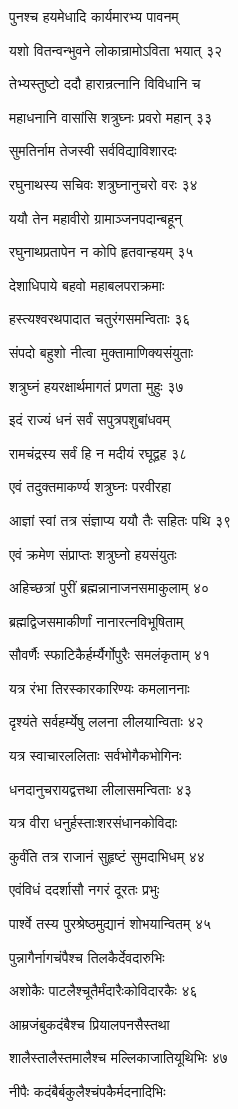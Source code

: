 पुनश्च हयमेधादि कार्यमारभ्य पावनम्

यशो वितन्वन्भुवने लोकान्रामोऽविता भयात् ३२

तेभ्यस्तुष्टो ददौ हारान्रत्नानि विविधानि च

महाधनानि वासांसि शत्रुघ्नः प्रवरो महान् ३३

सुमतिर्नाम तेजस्वी सर्वविद्याविशारदः

रघुनाथस्य सचिवः शत्रुघ्नानुचरो वरः ३४

ययौ तेन महावीरो ग्रामाञ्जनपदान्बहून्

रघुनाथप्रतापेन न कोपि हृतवान्हयम् ३५

देशाधिपाये बहवो महाबलपराक्रमाः

हस्त्यश्वरथपादात चतुरंगसमन्विताः ३६

संपदो बहुशो नीत्वा मुक्तामाणिक्यसंयुताः

शत्रुघ्नं हयरक्षार्थमागतं प्रणता मुहुः ३७

इदं राज्यं धनं सर्वं सपुत्रपशुबांधवम्

रामचंद्रस्य सर्वं हि न मदीयं रघूद्वह ३८

एवं तदुक्तमाकर्ण्य शत्रुघ्नः परवीरहा

आज्ञां स्वां तत्र संज्ञाप्य ययौ तैः सहितः पथि ३९

एवं क्रमेण संप्राप्तः शत्रुघ्नो हयसंयुतः

अहिच्छत्रां पुरीं ब्रह्मन्नानाजनसमाकुलाम् ४०

ब्रह्मद्विजसमाकीर्णां नानारत्नविभूषिताम्

सौवर्णैः स्फाटिकैर्हर्म्यैर्गोपुरैः समलंकृताम् ४१

यत्र रंभा तिरस्कारकारिण्यः कमलाननाः

दृश्यंते सर्वहर्म्येषु ललना लीलयान्विताः ४२

यत्र स्वाचारललिताः सर्वभोगैकभोगिनः

धनदानुचरायद्वत्तथा लीलासमन्विताः ४३

यत्र वीरा धनुर्हस्ताःशरसंधानकोविदाः

कुर्वंति तत्र राजानं सुहृष्टं सुमदाभिधम् ४४

एवंविधं ददर्शासौ नगरं दूरतः प्रभुः

पार्श्वे तस्य पुरश्रेष्ठमुद्यानं शोभयान्वितम् ४५

पुन्नागैर्नागचंपैश्च तिलकैर्देवदारुभिः

अशोकैः पाटलैश्चूतैर्मंदारैःकोविदारकैः ४६

आम्रजंबुकदंबैश्च प्रियालपनसैस्तथा

शालैस्तालैस्तमालैश्च मल्लिकाजातियूथिभिः ४७

नीपैः कदंबैर्बकुलैश्चंपकैर्मदनादिभिः

